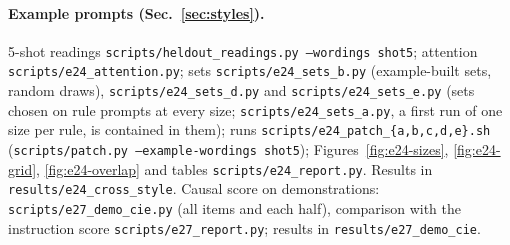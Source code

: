 \documentclass[10pt,a4paper]{article}
\begin{document}
{\paragraph{Example prompts (Sec.~\ref{sec:styles}).} 5-shot readings \texttt{scripts/heldout\_readings.py --wordings shot5}; attention \texttt{scripts/e24\_attention.py}; sets \texttt{scripts/e24\_sets\_b.py} (example-built sets, random draws), \texttt{scripts/e24\_sets\_d.py} and \texttt{scripts/e24\_sets\_e.py} (sets chosen on rule prompts at every size; \texttt{scripts/e24\_sets\_a.py}, a first run of one size per rule, is contained in them); runs \texttt{scripts/e24\_patch\_\{a,b,c,d,e\}.sh} (\texttt{scripts/patch.py --example-wordings shot5}); Figures~\ref{fig:e24-sizes}, \ref{fig:e24-grid}, \ref{fig:e24-overlap} and tables \texttt{scripts/e24\_report.py}. Results in \texttt{results/e24\_cross\_style}. Causal score on demonstrations: \texttt{scripts/e27\_demo\_cie.py} (all items and each half), comparison with the instruction score \texttt{scripts/e27\_report.py}; results in \texttt{results/e27\_demo\_cie}.\par}
\end{document}
